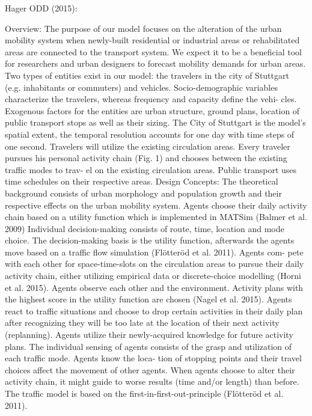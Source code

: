 Hager ODD (2015):

Overview:
The purpose of our model focuses on the alteration of the urban mobility system when newly-built residential or
industrial areas or rehabilitated areas are connected to the transport system. We expect it to be a beneficial tool for
researchers and urban designers to forecast mobility demands for urban areas.
Two types of entities exist in our model: the travelers in the city of Stuttgart (e.g. inhabitants or commuters) and
vehicles. Socio-demographic variables characterize the travelers, whereas frequency and capacity define the vehi-
cles. Exogenous factors for the entities are urban structure, ground plans, location of public transport stops as well as
their sizing. The City of Stuttgart is the model’s spatial extent, the temporal resolution accounts for one day with
time steps of one second. Travelers will utilize the existing circulation areas.
Every traveler pursues his personal activity chain (Fig. 1) and chooses between the existing traffic modes to trav-
el on the existing circulation areas. Public transport uses time schedules on their respective areas.
Design Concepts:
The theoretical background consists of urban morphology and population growth and their respective effects on
the urban mobility system. Agents choose their daily activity chain based on a utility function which is implemented
in MATSim (Balmer et al. 2009)
Individual decision-making consists of route, time, location and mode choice. The decision-making basis is the
utility function, afterwards the agents move based on a traffic flow simulation (Flötteröd et al. 2011). Agents com-
pete with each other for space-time-slots on the circulation areas to pursue their daily activity chain, either utilizing
empirical data or discrete-choice modelling (Horni et al. 2015). Agents observe each other and the environment.
Activity plans with the highest score in the utility function are chosen (Nagel et al. 2015).
Agents react to traffic situations and choose to drop certain activities in their daily plan after recognizing they
will be too late at the location of their next activity (replanning). Agents utilize their newly-acquired knowledge for
future activity plans.
The individual sensing of agents consists of the grasp and utilization of each traffic mode. Agents know the loca-
tion of stopping points and their travel choices affect the movement of other agents. When agents choose to alter
their activity chain, it might guide to worse results (time and/or length) than before. The traffic model is based on
the first-in-first-out-principle (Flötteröd et al. 2011).
